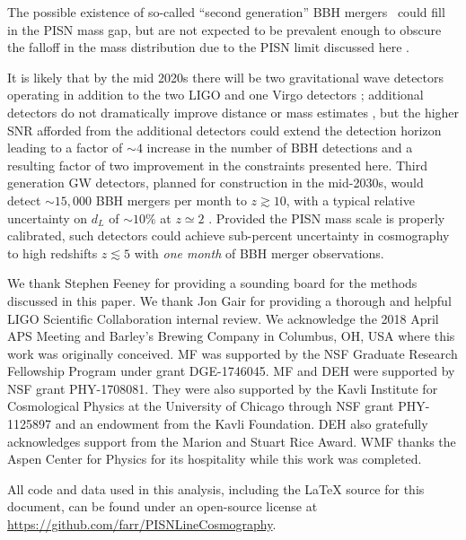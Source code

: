 \documentclass[modern]{aastex62}
\begin{document}
The possible existence of so-called ``second generation'' \ac{BBH} mergers~\citep[mergers where one black hole is itself a merger product, see e.g.][]{2017ApJ...840L..24F} could fill in the
\ac{PISN} mass gap, but are not expected to be prevalent enough to obscure the
falloff in the mass distribution due to the \ac{PISN} limit discussed here
\citep{Rodriguez2019}.

It is likely that by the mid 2020s there will be two gravitational wave
detectors operating in addition to the two LIGO and one Virgo detectors
\citep{ObsScenarios}; additional detectors do not dramatically improve distance
or mass estimates \citep{Vitale2017}, but the higher SNR afforded from the
additional detectors could extend the detection horizon leading to a factor of
$\sim 4$ increase in the number of \ac{BBH} detections and a resulting factor of
two improvement in the constraints presented here.  Third generation \ac{GW}
detectors, planned for construction in the mid-2030s, would detect $\sim 15,000$
\ac{BBH} mergers per month to $z \gtrsim 10$, with a typical relative
uncertainty on $d_L$ of $\sim 10 \%$ at $z \simeq 2$ \citep{Vitale2018}.
Provided the \ac{PISN} mass scale is properly calibrated, such detectors could
achieve sub-percent uncertainty in cosmography to high redshifts $z \lesssim 5$
with \emph{one month} of \ac{BBH} merger observations.

\acknowledgments

We thank Stephen Feeney for providing a sounding board for the methods discussed
in this paper.  We thank Jon Gair for providing a thorough and helpful LIGO
Scientific Collaboration internal review.  We acknowledge the 2018 April APS
Meeting and Barley's Brewing Company in Columbus, OH, USA where this work was
originally conceived. MF was supported by the NSF Graduate Research Fellowship
Program under grant DGE-1746045. MF and DEH were supported by  NSF grant
PHY-1708081. They were also supported by the Kavli Institute for Cosmological
Physics at the University of Chicago through NSF grant PHY-1125897 and an
endowment from the Kavli Foundation. DEH also gratefully acknowledges support
from the Marion and Stuart Rice Award.  WMF thanks the Aspen Center for Physics
for its hospitality while this work was completed.

All code and data used in this analysis, including the \LaTeX{} source for this
document, can be found under an open-source license at
\url{https://github.com/farr/PISNLineCosmography}.

\end{document}
